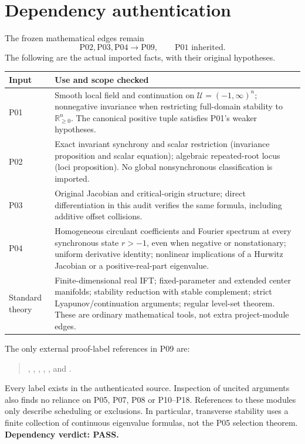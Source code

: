 \documentclass[11pt]{article}
\newcommand{\R}{\mathbb R}
\newcommand{\U}{\mathcal U}
\newcommand{\Orth}{\R_{\geq0}^n}
\begin{document}
\section{Dependency authentication}
\label{sec:deps}
The frozen mathematical edges remain
\[
 \mathrm{P02},\mathrm{P03},\mathrm{P04}\longrightarrow\mathrm{P09},
 \qquad \mathrm{P01}\text{ inherited}.
\]
The following are the actual imported facts, with their original hypotheses.
\begin{longtable}{@{}p{}p{}@{}}
\toprule Input & Use and scope checked\\\midrule\endhead
P01 & Smooth local field and continuation on $\U=(-1,\infty)^n$;
nonnegative invariance when restricting full-domain stability to $\Orth$.
The canonical positive tuple satisfies P01's weaker hypotheses.\\
P02 & Exact invariant synchrony and scalar restriction (invariance proposition
and scalar equation); algebraic repeated-root locus (loci proposition).
No global nonsynchronous classification is imported.\\
P03 & Original Jacobian and critical-origin structure; direct differentiation
in this audit verifies the same formula, including additive offset collisions.\\
P04 & Homogeneous circulant coefficients and Fourier spectrum at every
synchronous state $r>-1$, even when negative or nonstationary; uniform
derivative identity; nonlinear implications of a Hurwitz Jacobian or a
positive-real-part eigenvalue.\\
Standard theory & Finite-dimensional real IFT; fixed-parameter and extended
center manifolds; stability reduction with stable complement; strict
Lyapunov/continuation arguments; regular level-set theorem. These are ordinary
mathematical tools, not extra project-module edges.\\
\bottomrule
\end{longtable}
The only external proof-label references in P09 are:
\begin{quote}\raggedright
{}, , ,
, , and
.
\end{quote}
Every label exists in the authenticated source.
Inspection of uncited arguments also finds no reliance on P05, P07, P08 or
P10--P18. References to these modules only describe scheduling or exclusions.
In particular, transverse stability uses a finite collection of continuous
eigenvalue formulas, not the P05 selection theorem. \textbf{Dependency verdict:
PASS.}
\end{document}
